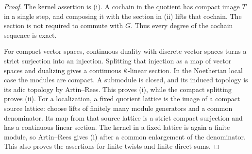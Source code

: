 
\begin{proof}
The kernel assertion is (i).  A cochain in the quotient has compact
image $T$ in a single step, and composing it with the section in (ii)
lifts that cochain.  The section is not required to commute with $G$.
Thus every degree of the cochain sequence is exact.

For compact vector spaces, continuous duality with discrete vector
spaces turns a strict surjection into an injection.  Splitting that
injection as a map of vector spaces and dualizing gives a continuous
$k$-linear section.  In the Noetherian local case the modules are
compact.  A submodule is closed, and its induced topology is its adic
topology by Artin--Rees.  This proves (i), while the compact splitting
proves (ii).  For a localization, a fixed quotient lattice is the image
of a compact source lattice: choose lifts of finitely many module
generators and a common denominator.  Its map from that source lattice
is a strict compact surjection and has a continuous linear section.
The kernel in a fixed lattice is again a finite module, so Artin--Rees
gives (i) after a common enlargement of the denominator.  This also
proves the assertions for finite twists and finite direct sums.
\end{proof}

